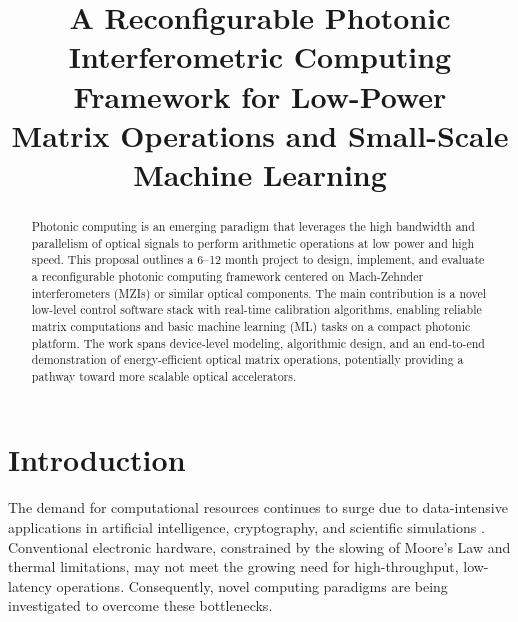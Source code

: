 \documentclass[conference]{IEEEtran}
\begin{document}
\title{A Reconfigurable Photonic Interferometric Computing Framework for Low-Power\\
Matrix Operations and Small-Scale Machine Learning}

\author{
}

\maketitle

\begin{abstract}
Photonic computing is an emerging paradigm that leverages the high bandwidth and parallelism of optical signals to perform arithmetic operations at low power and high speed. This proposal outlines a 6--12 month project to design, implement, and evaluate a reconfigurable photonic computing framework centered on Mach-Zehnder interferometers (MZIs) or similar optical components. The main contribution is a novel low-level control software stack with real-time calibration algorithms, enabling reliable matrix computations and basic machine learning (ML) tasks on a compact photonic platform. The work spans device-level modeling, algorithmic design, and an end-to-end demonstration of energy-efficient optical matrix operations, potentially providing a pathway toward more scalable optical accelerators.
\end{abstract}

\IEEEpeerreviewmaketitle

\vspace{2mm}
\section{Introduction}
The demand for computational resources continues to surge due to data-intensive applications in artificial intelligence, cryptography, and scientific simulations \cite{top500}. Conventional electronic hardware, constrained by the slowing of Moore's Law and thermal limitations, may not meet the growing need for high-throughput, low-latency operations. Consequently, novel computing paradigms are being investigated to overcome these bottlenecks.
\end{document}
